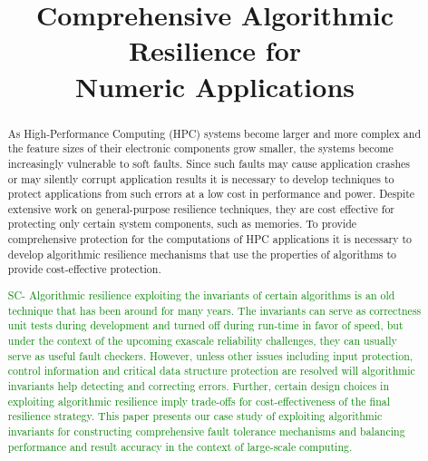 \documentclass{sig-alternate}
\title{Comprehensive Algorithmic Resilience for \\Numeric Applications}
\newcommand{\sui}[1]{%
  \textcolor{green}{SC-#1}
}
\begin{document}
\maketitle

\begin{abstract}
As High-Performance Computing (HPC) systems become larger and more complex and the feature sizes of their electronic components grow smaller, the systems become increasingly vulnerable to soft faults.
Since such faults may cause application crashes or may silently corrupt application results it is necessary to develop techniques to protect applications from such errors at a low cost in performance and power.
Despite extensive work on general-purpose resilience techniques, they are cost effective for protecting only certain system components, such as memories.
To provide comprehensive protection for the computations of HPC applications it is necessary to develop algorithmic resilience mechanisms that use the properties of algorithms to provide cost-effective protection.

\sui{
Algorithmic resilience exploiting the invariants of certain algorithms is an old technique that has been around for many years. The invariants can serve as
correctness unit tests during development and turned off during run-time in favor of speed, but under the context of the upcoming exascale reliability challenges,
they can usually serve as useful fault checkers. However, unless other issues including input protection, control information
and critical data structure protection are resolved will algorithmic invariants help detecting and correcting errors.
Further, certain design choices in exploiting algorithmic resilience imply trade-offs for cost-effectiveness of the final resilience strategy.
This paper presents our case study of exploiting algorithmic invariants for constructing comprehensive fault tolerance mechanisms and balancing performance and result accuracy in the context of large-scale computing.
}

\end{abstract}
\end{document}
